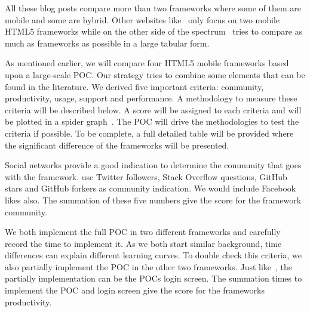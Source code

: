 \documentclass[a4paper]{artikel3}
\newcommand{\setspace}[0]{\vspace{2mm}}
\renewcommand{\paragraph}[1]{\setspace \noindent {\bf #1}  }
\begin{document}
All these blog posts compare more than two frameworks where some of them are mobile and some are hybrid.  
Other websites like~\cite{Bristowe2012,Burris} only focus on two mobile HTML5 frameworks while on the other side of the spectrum~\cite{Falk2011} tries to compare as much as frameworks as possible in a large tabular form.


As mentioned earlier,  we will compare four HTML5 mobile frameworks based upon a large-scale POC.  
Our strategy tries to combine some elements that can be found in the literature.  
We derived five important criteria:  community,  productivity,  usage,  support and performance.  
A methodology to measure these criteria will be described below.  
A score will be assigned to each criteria and will be plotted in a spider graph~\cite{Few2005}.   
The POC will drive the methodologies to test the criteria if possible.  
To be complete,  a full detailed table will be provided where the significant difference of the frameworks will be presented. 	

\paragraph{Community}
Social networks provide a good indication to determine the community that goes with the framework.  
\cite{Sarrafi2012a,Ayuso2012} use Twitter followers,  Stack Overflow questions,  GitHub stars and GitHub forkers as community indication.  
We would include Facebook likes also.  The summation of these five numbers give the score for the framework community.  

\paragraph{Productivity}
We both implement the full POC in two different frameworks and carefully record the time to implement it.  
As we both start similar background,  time differences can explain different learning curves.  
To double check this criteria,  we also partially implement the POC in the other two frameworks.  
Just like~\cite{Burris},  the partially implementation can be the POCs login screen.  
The summation times to implement the POC and login screen give the score for the frameworks productivity.  
\end{document}
